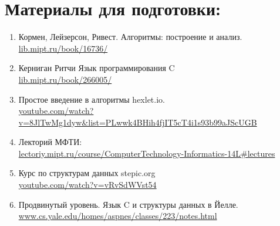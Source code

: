 \documentclass{article}
\begin{document}
\section*{Материалы для подготовки:}
\begin{enumerate}
\item Кормен, Лейзерсон, Ривест. Алгоритмы: построение и анализ.\\ 
\hspace*{16pt} \href{https://lib.mipt.ru/book/16736/}{lib.mipt.ru/book/16736/}
\item Керниган Ритчи Язык программирования C \\
\hspace*{16pt} \href{https://lib.mipt.ru/book/266005/}{lib.mipt.ru/book/266005/}
\item Простое введение в алгоритмы hexlet.io. \\ \hspace*{16pt} \href{https://www.youtube.com/watch?v=8JlTwMg1dyw&list=PLwwk4BHih4fjIT5cT4i1s93b99aJScUGB}{youtube.com/watch?v=8JlTwMg1dyw\&list=PLwwk4BHih4fjIT5cT4i1s93b99aJScUGB}
\item Лекторий МФТИ: \\ \hspace*{16pt} 
\href{http://lectoriy.mipt.ru/course/ComputerTechnology-Informatics-14L#lectures}
{lectoriy.mipt.ru/course/ComputerTechnology-Informatics-14L\#lectures}
\item Курс по структурам данных stepic.org  \\
\hspace*{16pt} \href{https://www.youtube.com/watch?v=vRvSdWVst54}{youtube.com/watch?v=vRvSdWVst54}
\item Продвинутый уровень. Язык C и структуры данных в Йелле.\\ \hspace*{16pt} \href{http://www.cs.yale.edu/homes/aspnes/classes/223/notes.html}{www.cs.yale.edu/homes/aspnes/classes/223/notes.html}
\end{enumerate}
\end{document}
